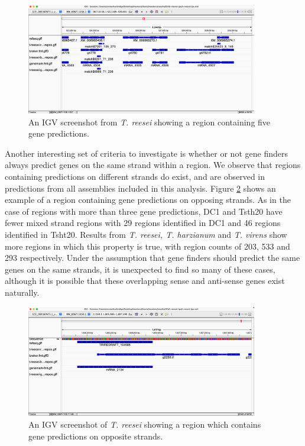 \begin{figure}
  \centering
  \includegraphics[width=0.9\textwidth]{figures/igv/igv-uncertain-regions.png}
  \caption[Example of a region with many gene calls]{An IGV screenshot
    from \textit{T. reesei} showing a region containing five
    gene predictions.}
  \label{fig:uncertain-regions}
\end{figure}

Another interesting set of criteria to investigate is whether or not
gene finders always predict genes on the same strand within a
region. We observe that regions containing predictions on different
strands do exist, and are observed in predictions from all assemblies
included in this analysis. Figure \ref{fig:opposing-strands} shows an
example of a region containing gene predictions on opposing
strands. As in the case of regions with more than three gene
predictions, DC1 and Tsth20 have fewer mixed strand regions with 29
regions identified in DC1 and 46 regions identified in Tsht20. Results
from \textit{T. reesei, T. harzianum} and \textit{T. virens} show more
regions in which this property is true, with region counts of 203, 533
and 293 respectively. Under the assumption that gene finders should
predict the same genes on the same strands, it is unexpected to find
so many of these cases, although it is possible that these overlapping
sense and anti-sense genes exist naturally\cite{Wright2022}.

\begin{figure}
  \centering
  \includegraphics[width=0.9\textwidth]{figures/igv/igv-opposing-strands.png}
  \caption[Predictions on opposing strands]{An IGV screenshot of
    \textit{T. reesei} showing a region which contains gene
    predictions on opposite strands.}
  \label{fig:opposing-strands}
\end{figure}

